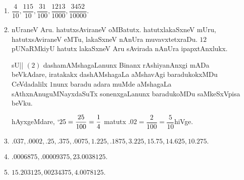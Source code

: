 \begin{enumerate}[\rm(1)]
\item $\dfrac{4}{10}, \dfrac{115}{10}, \dfrac{31}{100}, \dfrac{1213}{1000}, \dfrac{3452}{10000}$.

\item nUraneV Aru. hatutxsAviraneV oMBatutx. hatutxlakaSxneV mUru, hatutxsAviraneV eMTu, lakaSxneV nAnUra muvavxtetxraDu. $12$ pUNaRMkiyU hatutx lakaSxneV Aru sAvirada nAnUra ipapxtAnxlukx.

sU|| $(2)$ dashamAMshagaLanunx Binanx rAshiyanAnxgi mADa beVkAdare, iratakakx dashAMshagaLa aMshavAgi baradukokxMDu CeVdadalilx $1$nunx baradu adara muMde aMshagaLa sAthxnAnuguMNayxdaSuTx sonenxgaLanunx baradukoMDu saMkeSxVpisa beVku.

hAyxgeMdare, $`25=\dfrac{25}{100}=\dfrac{1}{4}$ matutx $.02=\dfrac{2}{100}=\dfrac{5}{10}$hiVge.

\item $.037, .0002, .25, .375, .0075, 1.225, .1875, 3.225, 15.75, 14.625, 10.275.$

\item $.0006875, .00009375, 23.0038125.$

\item $15.203125, 00234375, 4.0078125$. 
\end{enumerate}

